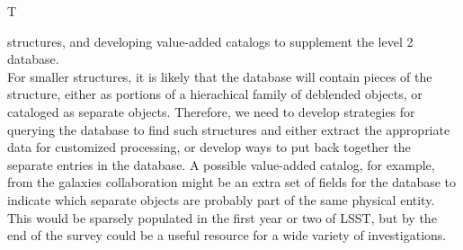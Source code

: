 \begin{tasklist}{T}
\begin{task}
{structures, and developing value-added catalogs to supplement the level 2 database.\\
For smaller structures, it is likely that the database will contain pieces 
of the structure, either as portions of a hierachical
family of deblended objects, or cataloged as separate objects. Therefore, we need to 
develop strategies for querying the database to find such structures and either extract
the appropriate data for customized processing, or develop ways to put back together
the separate entries in the database. A possible value-added catalog, for example, from
the galaxies collaboration might be an extra set of fields for the database to indicate 
which separate objects are probably part of the same physical entity. This would
be sparsely populated in the first year or two of LSST, but by the end of the survey 
could be a useful resource for a wide variety of investigations.
}

\end{task}


\end{tasklist}
